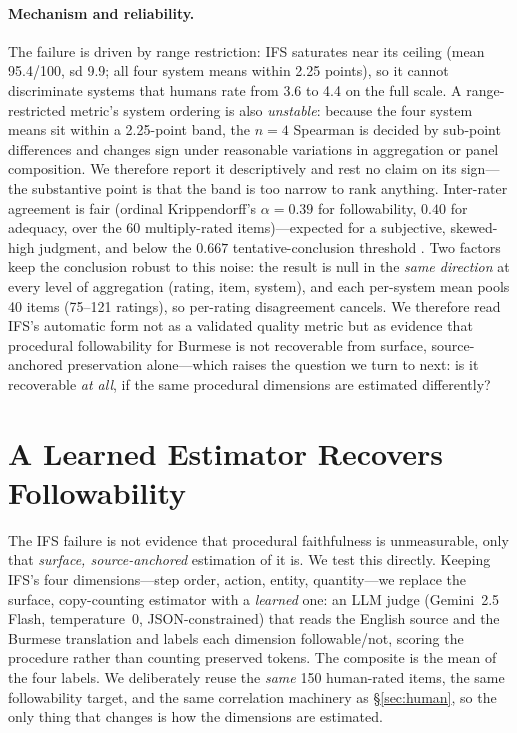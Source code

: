 \documentclass[11pt]{article}
\begin{document}
\paragraph{Mechanism and reliability.} The failure is driven by range restriction: IFS
saturates near its ceiling (mean 95.4/100, sd 9.9; all four system means within 2.25 points), so
it cannot discriminate systems that humans rate from 3.6 to 4.4 on the full scale. A
range-restricted metric's system ordering is also \emph{unstable}: because the four system means
sit within a 2.25-point band, the $n{=}4$ Spearman is decided by sub-point differences and
changes sign under reasonable variations in aggregation or panel composition. We therefore report
it descriptively and rest no claim on its sign---the substantive point is that the band is too
narrow to rank anything. Inter-rater agreement is fair (ordinal Krippendorff's
$\alpha{=}0.39$ for followability, $0.40$ for adequacy, over the 60 multiply-rated
items)---expected for a subjective, skewed-high judgment, and below the
$0.667$ tentative-conclusion threshold \citep{krippendorff2004}. Two factors keep the
conclusion robust to this noise: the result is null in the \emph{same direction} at every level
of aggregation (rating, item, system), and each per-system mean pools 40 items (75--121 ratings),
so per-rating disagreement cancels. We therefore read IFS's automatic form not as a validated
quality metric but as evidence that procedural followability for Burmese is not recoverable
from surface, source-anchored preservation alone---which raises the question we turn to next:
is it recoverable \emph{at all}, if the same procedural dimensions are estimated differently?

\section{A Learned Estimator Recovers Followability}\label{sec:estimator}
The IFS failure is not evidence that procedural faithfulness is unmeasurable, only that
\emph{surface, source-anchored} estimation of it is. We test this directly. Keeping IFS's four
dimensions---step order, action, entity, quantity---we replace the surface, copy-counting
estimator with a \emph{learned} one: an LLM judge (Gemini~2.5 Flash, temperature~0, JSON-constrained)
that reads the English source and the Burmese translation and labels each dimension
followable/not, scoring the procedure rather than counting preserved tokens. The composite is the
mean of the four labels. We deliberately reuse the \emph{same} 150 human-rated items, the same
followability target, and the same correlation machinery as \S\ref{sec:human}, so the only thing
that changes is how the dimensions are estimated.
\end{document}
